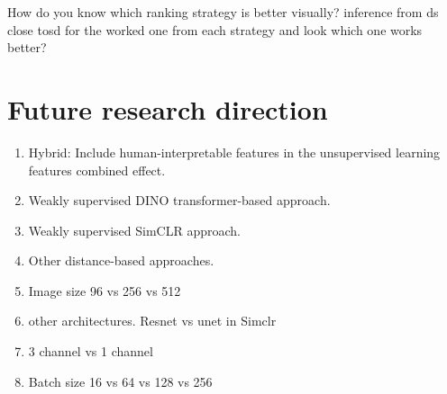 	
How do you know which ranking strategy is better visually? inference from ds close tosd for the worked one from each strategy and look which one works better?

\section{Future research direction}

\begin{enumerate}
    \item Hybrid: Include human-interpretable features in the unsupervised learning features combined effect.
    \item Weakly supervised DINO transformer-based approach.
    \item Weakly supervised SimCLR approach.
    \item Other distance-based approaches.
    \item Image size 96 vs 256 vs 512
    \item other architectures. Resnet vs unet in Simclr
    \item 3 channel vs 1 channel
    \item Batch size 16 vs 64 vs 128 vs 256
\end{enumerate}